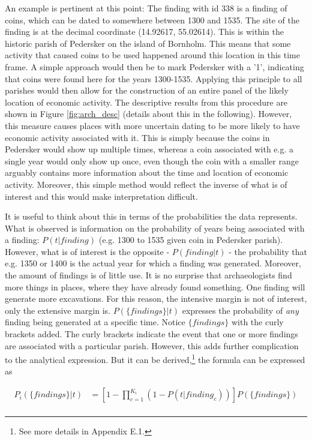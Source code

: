 \documentclass[11pt]{article}
\begin{document}
An example is pertinent at this point: The finding with id 338 is a finding of coins, which can be dated to somewhere between 1300 and 1535. The site of the finding is at the decimal coordinate (14.92617, 55.02614). This is within the historic parish of Pedersker on the island of Bornholm. This means that some activity that caused coins to be used happened around this location in this time frame. A simple approach would then be to mark Pedersker with a '1', indicating that coins were found here for the years 1300-1535. Applying this principle to all parishes would then allow for the construction of an entire panel of the likely location of economic activity. The descriptive results from this procedure are shown in Figure \ref{fig:arch_desc} (details about this in the following). However, this measure causes places with more uncertain dating to be more likely to have economic activity associated with it. This is simply because the coins in Pedersker would show up multiple times, whereas a coin associated with e.g. a single year would only show up once, even though the coin with a smaller range arguably contains more information about the time and location of economic activity. Moreover, this simple method would reflect the inverse of what is of interest and this would make interpretation difficult. 

It is useful to think about this in terms of the probabilities the data represents. What is observed is information on the probability of years being associated with a finding: $P(t|finding)$ (e.g. 1300 to 1535 given coin in Pedersker parish). However, what is of interest is the opposite - $P(finding|t)$ - the probability that e.g. 1350 or 1400 is the actual year for which a finding was generated. Moreover, the amount of findings is of little use. It is no surprise that archaeologists find more things in places, where they have already found something. One finding will generate more excavations. For this reason, the intensive margin is not of interest, only the extensive margin is. $P(\{findings\}|t)$ expresses the probability of \textit{any} finding being generated at a specific time. Notice $\{findings\}$ with the curly brackets added. The curly brackets indicate the event that one or more findings are associated with a particular parish. However, this adds further complication to the analytical expression. But it can be derived,\footnote{See more details in Appendix E.1.} the formula can be expressed as 

\begin{equation}
\begin{split}
\label{eq:arch1}
P_i(\{findings\}|t)&=\left[1-\prod_{c=1}^{K_i} \left( 1 - P(t|finding_c) \right)\right] P(\{findings\}) \\
\end{split}
\end{equation}
\end{document}
